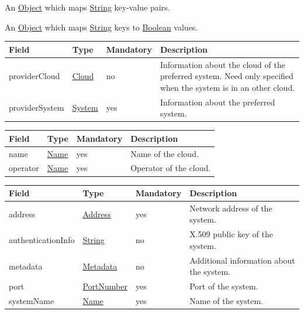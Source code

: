 \documentclass[a4paper]{arrowhead}
\newcommand{\pref}[1]{{\textcolor{ArrowheadGrey}{\hyperref[sec:model:primitives:#1]{#1}}}}
\begin{document}
\label{sec:model:Metadata}

An \pref{Object} which maps \pref{String} key-value pairs.

\label{sec:model:OrchestrationFlags}

An \pref{Object} which maps \pref{String} keys to \pref{Boolean} values. 

\clearpage

\label{sec:model:PreferredProvider}

\begin{table}[ht!]
\begin{tabularx}{\textwidth}{| p{4cm} | p{4cm} | p{2cm} | X |} \hline
\rowcolor{gray!33} Field & Type & Mandatory & Description \\ \hline

providerCloud &\hyperref[sec:model:Cloud]{Cloud} & no & Information about the cloud of the preferred system. Need only specified when the system is in an other cloud. \\ \hline
providerSystem &\hyperref[sec:model:System]{System} & yes & Information about the preferred system.  \\ \hline
\end{tabularx}
\end{table}

\label{sec:model:Cloud}

\begin{table}[ht!]
\begin{tabularx}{\textwidth}{| p{4cm} | p{4cm} | p{2cm} | X |} \hline
\rowcolor{gray!33} Field & Type & Mandatory & Description \\ \hline

name &\pref{Name} & yes & Name of the cloud. \\ \hline
operator &\pref{Name} & yes & Operator of the cloud. \\ \hline
\end{tabularx}
\end{table}

\label{sec:model:System}

\begin{table}[ht!]
\begin{tabularx}{\textwidth}{| p{4cm} | p{4cm} | p{2cm} | X |} \hline
\rowcolor{gray!33} Field & Type & Mandatory & Description \\ \hline

address &\pref{Address} & yes & Network address of the system. \\ \hline
authenticationInfo &\pref{String} & no & X.509 public key of the system. \\ \hline
metadata &\hyperref[sec:model:Metadata]{Metadata} & no & Additional information about the system. \\ \hline
port &\pref{PortNumber} & yes & Port of the system. \\ \hline
systemName &\pref{Name} & yes & Name of the system. \\ \hline
\end{tabularx}
\end{table}
\end{document}
